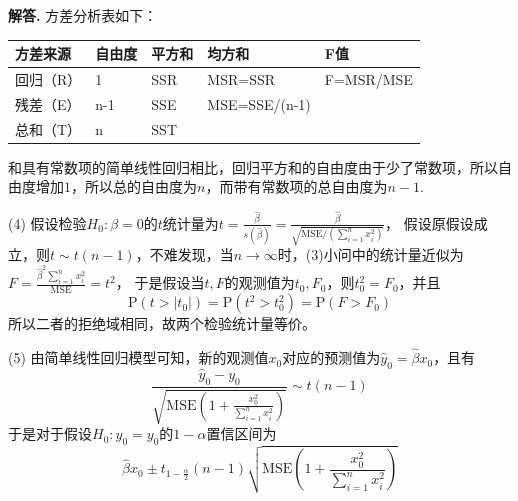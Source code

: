 \documentclass[12pt, a4paper, oneside]{ctexart}
\newenvironment{solution}[1][]{\par\noindent\textbf{#1解答. }}{\smallskip\par}  %
\def\P{\textrm{P}}          %
\def\add{\vspace{1ex}}      %
\begin{document}
\begin{solution}
    方差分析表如下：
    \renewcommand\arraystretch{0.8} %
    \begin{table}[!htbp] %
        \centering %
        \begin{tabular}{p{3cm}<{\centering}p{2cm}<{\centering}p{2cm}<{\centering}p{4cm}<{\centering}p{3cm}<{\centering}} %
            \toprule
            方差来源 & 自由度 &平方和 &  均方和 & F值 \\
            \midrule
            回归（R） & 1 & SSR & MSR=SSR & F=MSR/MSE \\
            残差（E） & n-1 & SSE & MSE=SSE/(n-1) & \\
            总和（T） & n & SST & &\\
            \bottomrule
        \end{tabular}
    \end{table}

    和具有常数项的简单线性回归相比，回归平方和的自由度由于少了常数项，所以自由度增加$1$，所以总的自由度为$n$，而带有常数项的总自由度为$n-1$.\add

    (4) 假设检验$H_0 : \beta = 0$的$t$统计量为$t = \frac{\hat{\beta}}{s(\hat{\beta})} = \frac{\hat{\beta}}{\sqrt{\text{MSE} / (\sum_{i=1}^nx_i^2)}}$，
    假设原假设成立，则$t\sim t(n-1)$，不难发现，当$n\to\infty$时，(3)小问中的统计量近似为$F = \frac{\hat{\beta}^2\sum_{i=1}^nx_i^2}{\text{MSE}} = t^2$\add，
    于是假设当$t,F$的观测值为$t_0,F_0$，则$t_0^2 = F_0$，并且
    \begin{equation*}
        \P(t > |t_0|) = \P(t^2 > t_0^2) = \P(F > F_0)
    \end{equation*}
    所以二者的拒绝域相同，故两个检验统计量等价。

    (5) 由简单线性回归模型可知，新的观测值$x_0$对应的预测值为$\hat{y}_0 = \hat{\beta}x_0$，且有
    \begin{equation*}
        \frac{\hat{y}_0 - y_0}{\sqrt{\text{MSE} (1 + \frac{x_0^2}{\sum_{i=1}^nx_i^2})}}\sim t(n-1)   
    \end{equation*}
    于是对于假设$H_0:\hat{y}_0 = y_0$的$1-\alpha$置信区间为
    \begin{equation*}
        \hat{\beta}x_0 \pm t_{1-\frac{\alpha}{2}}(n-1)\sqrt{\text{MSE}(1 + \frac{x_0^2}{\sum_{i=1}^nx_i^2})}
    \end{equation*}
\end{solution}
\end{document}
